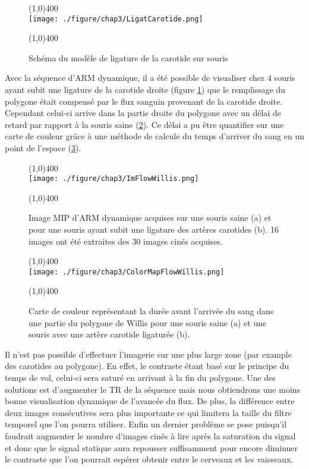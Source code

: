 \begin{figure}[H]
\centering \line(1,0){400} \\
\texttt{[image: ./figure/chap3/LigatCarotide.png]}
\caption[Modèle de ligature des carotides]{\label{fig:LigatCarotide} Schéma du modèle de ligature de la carotide sur souris}
\line(1,0){400} \\ \end{figure}

Avec la séquence d'ARM dynamique, il a été possible de visualiser chez 4 souris ayant subit une ligature de la carotide droite (figure \ref{fig:LigatCarotide}) que le remplissage du polygone était compensé par le flux sanguin provenant de la carotide droite. Cependant celui-ci arrive dans la partie droite du polygone avec un délai de retard par rapport à la souris saine (\ref{fig:ImFlowWillis}).
Ce délai a pu être quantifier sur une carte de couleur grâce à une méthode de calcule du temps d'arriver du sang en un point de l'espace (\ref{fig:ColorMapFlowWillis}).

\begin{figure}[H]
\centering \line(1,0){400} \\
\texttt{[image: ./figure/chap3/ImFlowWillis.png]}
\caption[Image d'ARM dynamique sur souris du polygone de Willis]{\label{fig:ImFlowWillis} Image MIP d'ARM dynamique acquises sur une souris saine (a) et pour une souris ayant subit une ligature des artères carotides (b). 16 images ont été extraites des 30 images cinés acquises.}
\line(1,0){400} \\ \end{figure}

\begin{figure}[H]
\centering \line(1,0){400} \\
\texttt{[image: ./figure/chap3/ColorMapFlowWillis.png]}
\caption[Image d'ARM dynamique sur souris du polygone de Willis]{\label{fig:ColorMapFlowWillis} Carte de couleur représentant la durée avant l'arrivée du sang dans une partie du polygone de Willis pour une souris saine (a) et une souris avec une artère carotide ligaturée (b).}
\line(1,0){400} \\ \end{figure}

Il n'est pas possible d'effectuer l'imagerie sur une plus large zone (par example des carotides au polygone). En effet, le contraste étant basé sur le principe du temps de vol, celui-ci sera saturé en arrivant à la fin du polygone. Une des solutions est d'augmenter le TR de la séquence mais nous obtiendrons une moins bonne visualisation dynamique de l'avancée du flux. De plus, la différence entre deux images consécutives sera plus importante ce qui limitera la taille du filtre temporel que l'on pourra utiliser. Enfin un dernier problème se pose puisqu'il faudrait augmenter le nombre d'images cinés à lire après la saturation du signal et donc que le signal statique aura repousser suffisamment pour encore diminuer le contraste que l'on pourrait espérer obtenir entre le cerveaux et les vaisseaux.

